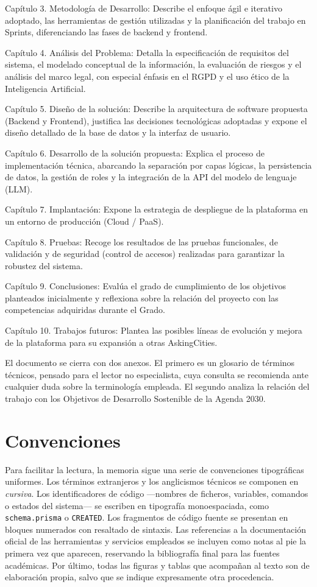 \documentclass[11pt,oneside,spanish,listoffigures,listoftables]{tfgetsinf}
\begin{document}
Capítulo 3. Metodología de Desarrollo: Describe el enfoque ágil e iterativo adoptado, las herramientas de gestión utilizadas y la planificación del trabajo en Sprints, diferenciando las fases de backend y frontend.

Capítulo 4. Análisis del Problema: Detalla la especificación de requisitos del sistema, el modelado conceptual de la información, la evaluación de riesgos y el análisis del marco legal, con especial énfasis en el RGPD y el uso ético de la Inteligencia Artificial.

Capítulo 5. Diseño de la solución: Describe la arquitectura de software propuesta (Backend y Frontend), justifica las decisiones tecnológicas adoptadas y expone el diseño detallado de la base de datos y la interfaz de usuario.

Capítulo 6. Desarrollo de la solución propuesta: Explica el proceso de implementación técnica, abarcando la separación por capas lógicas, la persistencia de datos, la gestión de roles y la integración de la API del modelo de lenguaje (LLM).

Capítulo 7. Implantación: Expone la estrategia de despliegue de la plataforma en un entorno de producción (Cloud / PaaS).

Capítulo 8. Pruebas: Recoge los resultados de las pruebas funcionales, de validación y de seguridad (control de accesos) realizadas para garantizar la robustez del sistema.

Capítulo 9. Conclusiones: Evalúa el grado de cumplimiento de los objetivos planteados inicialmente y reflexiona sobre la relación del proyecto con las competencias adquiridas durante el Grado.

Capítulo 10. Trabajos futuros: Plantea las posibles líneas de evolución y mejora de la plataforma para su expansión a otras AskingCities.

El documento se cierra con dos anexos. El primero es un glosario de términos técnicos, pensado para el lector no especialista, cuya consulta se recomienda ante cualquier duda sobre la terminología empleada. El segundo analiza la relación del trabajo con los Objetivos de Desarrollo Sostenible de la Agenda 2030.

\section{Convenciones}

Para facilitar la lectura, la memoria sigue una serie de convenciones tipográficas uniformes. Los términos extranjeros y los anglicismos técnicos se componen en \textit{cursiva}. Los identificadores de código —nombres de ficheros, variables, comandos o estados del sistema— se escriben en tipografía monoespaciada, como \texttt{schema.prisma} o \texttt{CREATED}. Los fragmentos de código fuente se presentan en bloques numerados con resaltado de sintaxis. Las referencias a la documentación oficial de las herramientas y servicios empleados se incluyen como notas al pie la primera vez que aparecen, reservando la bibliografía final para las fuentes académicas. Por último, todas las figuras y tablas que acompañan al texto son de elaboración propia, salvo que se indique expresamente otra procedencia.
\end{document}
